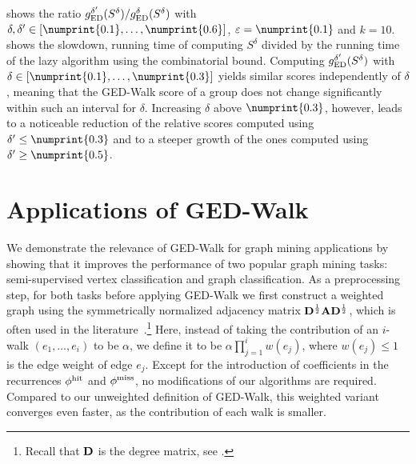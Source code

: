  shows the ratio $g_{\text{ED}}^{\delta'}(S^{\delta})
/ g_{\text{ED}}^{\delta}(S^{\delta})$ with
$\delta, \delta' \in [\numprint{0.1}, \ldots, \numprint{0.6}]$, $\epsilon =
\numprint{0.1}$ and $k = 10$.
%
 shows the slowdown, \ie running time of computing
$S^{\delta}$ divided by the running time of the lazy algorithm using the combinatorial
bound. Computing $g_{\text{ED}}^{\delta'}(S^{\delta})$ with $\delta\in[\numprint{0.1}, \ldots,\numprint{0.3}]$
yields similar scores independently of $\delta$, meaning that the GED-Walk score of a group
does not change significantly within such an interval for $\delta$. Increasing $\delta$
above $\numprint{0.3}$, however, leads to a noticeable reduction of the relative
scores computed using $\delta' \le \numprint{0.3}$ and to a steeper growth of the ones
computed using $\delta' \ge \numprint{0.5}$.

\section{Applications of GED-Walk}
%
We demonstrate the relevance of GED-Walk for graph mining applications
by showing that it improves the performance of two popular graph mining tasks:
semi-supervised vertex classification and graph classification.
As a preprocessing step, for both tasks before applying GED-Walk we first construct a weighted
graph using the symmetrically normalized adjacency matrix $\mathbf{D}^{\frac 12}\mathbf{A}\mathbf{D}^{\frac 12}$,
which is often used in the literature~\cite{DBLP:conf/iclr/KipfW17,DBLP:conf/nips/ZhouBLWS03}.\footnote{
Recall that $\mathbf{D}$ is the degree matrix, see .}
Here, instead of taking the contribution of an $i$-walk $(e_1, \ldots, e_i)$ to be $\alpha$, we
define it to be $\alpha\prod_{j = 1}^i w(e_j)$, where $w(e_j) \le 1$ is the edge weight
of edge $e_j$. Except for the introduction of coefficients in the recurrences $\phi^{\text{hit}}$ and
$\phi^{\text{miss}}$, no modifications of our algorithms are required. Compared to our unweighted definition
of GED-Walk, this weighted variant converges even faster, as the contribution of each walk is
smaller.



